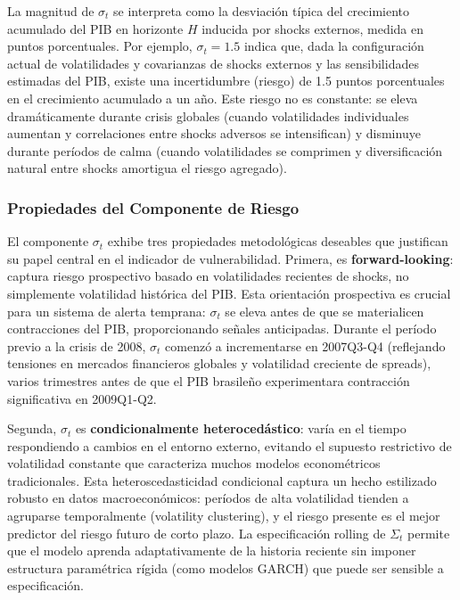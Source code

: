 \documentclass[3p,11pt,draft,natbib=false]{elsarticle}
\begin{document}
La magnitud de $\sigma_t$ se interpreta como la desviación típica del crecimiento acumulado del PIB en horizonte $H$ inducida por shocks externos, medida en puntos porcentuales. Por ejemplo, $\sigma_t = 1.5$ indica que, dada la configuración actual de volatilidades y covarianzas de shocks externos y las sensibilidades estimadas del PIB, existe una incertidumbre (riesgo) de 1.5 puntos porcentuales en el crecimiento acumulado a un año. Este riesgo no es constante: se eleva dramáticamente durante crisis globales (cuando volatilidades individuales aumentan y correlaciones entre shocks adversos se intensifican) y disminuye durante períodos de calma (cuando volatilidades se comprimen y diversificación natural entre shocks amortigua el riesgo agregado).

\subsubsection{Propiedades del Componente de Riesgo}

El componente $\sigma_t$ exhibe tres propiedades metodológicas deseables que justifican su papel central en el indicador de vulnerabilidad. Primera, es \textbf{forward-looking}: captura riesgo prospectivo basado en volatilidades recientes de shocks, no simplemente volatilidad histórica del PIB. Esta orientación prospectiva es crucial para un sistema de alerta temprana: $\sigma_t$ se eleva antes de que se materialicen contracciones del PIB, proporcionando señales anticipadas. Durante el período previo a la crisis de 2008, $\sigma_t$ comenzó a incrementarse en 2007Q3-Q4 (reflejando tensiones en mercados financieros globales y volatilidad creciente de spreads), varios trimestres antes de que el PIB brasileño experimentara contracción significativa en 2009Q1-Q2.

Segunda, $\sigma_t$ es \textbf{condicionalmente heterocedástico}: varía en el tiempo respondiendo a cambios en el entorno externo, evitando el supuesto restrictivo de volatilidad constante que caracteriza muchos modelos econométricos tradicionales. Esta heteroscedasticidad condicional captura un hecho estilizado robusto en datos macroeconómicos: períodos de alta volatilidad tienden a agruparse temporalmente (volatility clustering), y el riesgo presente es el mejor predictor del riesgo futuro de corto plazo. La especificación rolling de $\Sigma_t$ permite que el modelo aprenda adaptativamente de la historia reciente sin imponer estructura paramétrica rígida (como modelos GARCH) que puede ser sensible a especificación.
\end{document}
